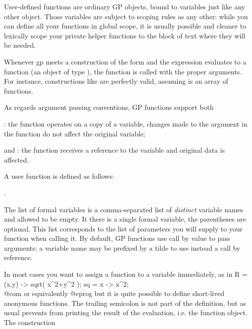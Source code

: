 User-defined functions are ordinary GP objects, bound to variables just like
any other object. Those variables are subject to scoping rules as any other:
while you can define all your functions in global scope, it is usually
possible and cleaner to lexically scope your private helper functions to the
block of text where they will be needed.

Whenever gp meets a construction of the form 
and the expression  evaluates to a function (an object of type
), the function is called with the proper arguments. For
instance, constructions like  are perfectly valid,
assuming  is an array of functions.

As regards argument passing conventions, GP functions support both

\item {}: the function operates on a copy of a variable,
changes made to the argument in the function do not affect the original
variable;

\item and : the function receives a reference to the
variable and original data is affected.

\label{se:userfundef}

A user function is defined as follows:

  .

\noindent The list of formal variables is a comma-separated list of
\emph{distinct} variable names and allowed to be empty. It there is a single
formal variable, the parentheses are optional. This list corresponds to the
list of parameters you will supply to your function when calling it. By
default, GP functions use call by value to pass arguments; a variable
name may be prefixed by a tilde \kbd{\til} to use instead a call by
reference.

In most cases you want to assign a function to a variable immediately, as in
\bprog
R = (x,y) -> sqrt( x^2+y^2 );
sq = x -> x^2;  \\@com or equivalently 
@eprog\noindent
but it is quite possible to define short-lived anonymous functions.
The trailing semicolon is not part of the definition, but as usual prevents
 from printing the result of the evaluation, i.e. the function
object. The construction


